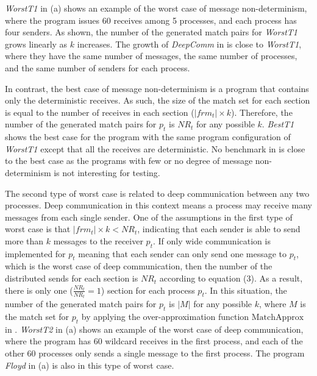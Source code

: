 \textit{WorstT1} in  (a) shows an example of the worst case of message non-determinism, where the program issues 60 receives among 5 processes, and each process has four senders. 
As shown, the number of the generated match pairs for \textit{WorstT1} grows linearly as $k$ increases. 
The growth of \textit{DeepComm} in  is close to \textit{WorstT1}, where they have the same number of messages, the same number of processes, and the same number of senders for each process.

In contrast, the best case of message non-determinism is a program that contains only the deterministic receives. 
As such, the size of the match set for each section is equal to the number of receives in each section ($|frm_t|\times k$). Therefore, the number of the generated match pairs for $p_t$ is $\mathit{NR}_t$ for any possible $k$. \textit{BestT1} shows  the best case for the program with the same program configuration of \textit{WorstT1} except that all the receives are deterministic.
No benchmark in  is close to the best case as the programs with few or no degree of message non-determinism is not interesting for testing.  

The second type of worst case is related to deep communication between any two processes. Deep communication in this context means a process may receive many messages from each single sender.
One of the assumptions in the first type of worst case is that $|frm_t|\times k < \mathit{NR}_t$, indicating that each sender is able to send more than $k$ messages to the receiver $p_t$. 
If only wide communication is implemented for $p_t$ meaning that each sender can only send one message to $p_t$, which is the worst case of deep communication, then the number of the distributed sends for each section is $\mathit{NR}_t$ according to equation (3). 
As a result, there is only one ($\frac{\mathit{NR}_t}{\mathit{NR}_t} = 1$) section for each process $p_t$. 
In this situation, the number of the generated match pairs for $p_t$ is $|M|$ for any possible $k$, where $M$ is the match set for $p_t$ by applying the over-approximation function $\mathrm{MatchApprox}$ in . 
\textit{WorstT2} in  (a) shows an example of the worst case of deep communication, where the program has 60 wildcard receives in the first process, and each of the other 60 processes only sends a single message to the first process. 
The program \textit{Floyd} in  (a) is also in this type of worst case. 


